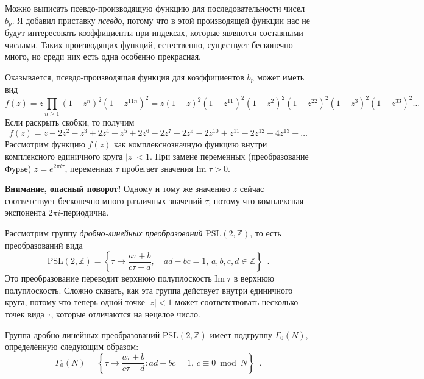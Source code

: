 \documentclass{article}
\theoremstyle{definition}
\begin{document}

Можно выписать псевдо-производящую функцию для последовательности чисел \( b_p
\). Я добавил приставку \textit{псевдо}, потому что в этой производящей функции нас
не будут интересовать коэффициенты при индексах, которые являются составными числами.
Таких производящих функций, естественно, существует бесконечно много, но среди
них есть одна особенно прекрасная.

Оказывается, псевдо-производящая функция для коэффициентов \( b_p \) может иметь вид
\[
	f(z) = z\prod_{n \geq 1}(1 - z^{n})^2(1 - z^{11 n})^{2} = 
	z(1 - z)^2(1 - z^{11})^{2}(1 - z^2)^2(1 - z^{22})^{2}(1 - z^3)^2(1 - 
	z^{33})^{2} \ldots
\]
Если раскрыть скобки, то получим
\[
	f(z) = z - 2z^2 - z^3 + 2z^4 + z^5 + 2z^6 - 2z^7 - 2z^9 - 2z^{10} + z^{11} 
	- 
	2z^{12} + 4z^{13} + \ldots
\]
Рассмотрим функцию \( f(z) \) как комплекснозначную функцию внутри комплексного
единичного круга \( {|z| < 1} \). При замене переменных (преобразование Фурье)
\( z = e^{2 \pi i \tau} \), переменная \( \tau \) пробегает значения \(
\mathrm{Im}\; \tau > 0 \).

\textbf{Внимание, опасный поворот!} Одному и тому же значению \( z \) сейчас
соответствует бесконечно много различных значений \( \tau \), потому что
комплексная экспонента \( 2 \pi i \)-периодична.

Рассмотрим группу \textit{дробно-линейных преобразований} \( \mathrm{PSL}(2,
\mathbb Z) \), то есть преобразований вида
\[
    \mathrm{PSL}(2, \mathbb Z) = \left\{
        \tau \to \dfrac{a \tau + b}{c \tau + d}, \quad
         ad - bc = 1, \, a, b, c, d \in \mathbb Z
    \right\} \enspace .
\]
Это преобразование переводит верхнюю полуплоскость \( \mathrm{Im}\; \tau \) в
верхнюю полуплоскость. Сложно сказать, как эта группа действует внутри
единичного круга, потому что теперь одной точке \( |z| < 1 \) может
соответствовать несколько точек вида \( \tau \), которые отличаются на нецелое
число.

Группа дробно-линейных преобразований \( \mathrm{PSL}(2, \mathbb
Z) \) имеет подгруппу \( \Gamma_0(N) \), определённую следующим образом:
\[
	\Gamma_0(N) = \left\{
		\tau \to \dfrac{a\tau + b}{c\tau + d} \colon ad - bc = 1, \, c \equiv 0
\bmod N
	\right\} \enspace .
\]
\end{document}
